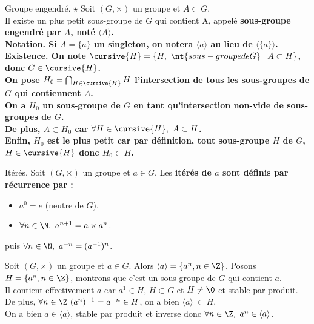 \documentclass[11pt]{article}
\begin{document}
\begin{defi}{Groupe engendré. $\star$}{}
    Soit $(G,\times)$ un groupe et $A\subset G$.\\
    Il existe un plus petit sous-groupe de $G$ qui contient A, appelé \bf{sous-groupe engendré} par $A$, noté $\langle A\rangle $.\\
    \bf{Notation.} Si $A=\{a\}$ un singleton, on notera $\langle a\rangle $ au lieu de $\langle \{a\}\rangle $.
    \tcblower
    \bf{Existence.} On note $\cursive{H}=\{H, ~ \nt{sous-groupe de G} \mid A\subset H\}$, donc $G\in \cursive{H}$.\\
    On pose $H_0=\bigcap_{H\in\cursive{H}}H$ l'intersection de tous les sous-groupes de $G$ qui contiennent $A$.\\
    On a $H_0$ un sous-groupe de $G$ en tant qu'intersection non-vide de sous-groupes de $G$.\\
    De plus, $A\subset H_0$ car $\forall H \in \cursive{H}, ~ A\subset H$.\\
    Enfin, $H_0$ est le plus petit car par définition, tout sous-groupe $H$ de $G$, $H\in\cursive{H}$ donc $H_0\subset H$.
\end{defi}

\begin{defi}{Itérés.}{}
    Soit $(G,\times)$ un groupe et $a\in G$. Les \bf{itérés} de $a$ sont définis par récurrence par :
    \begin{itemize}
        \item $a^0=e$ (neutre de $G$).
        \item $\forall n \in \N, ~ a^{n+1}=a\times a^n$.
    \end{itemize}
    puis $\forall n \in \N, ~ a^{-n}=(a^{-1})^{n}$.
\end{defi}

\vspace*{-0.8cm}

\begin{thm}{}{}
    Soit $(G,\times)$ un groupe et $a\in G$. Alors $\langle a\rangle =\{a^n,n\in\Z\}$.
    \tcblower
    \boxed{\subset} Posons $H=\{a^n, n\in \Z\}$, montrons que c'est un sous-groupe de $G$ qui contient $a$.\\
    Il contient effectivement $a$ car $a^1\in H$, $H\subset G$ et $H\neq\0$ et stable par produit.\\
    De plus, $\forall n \in \Z ~ (a^n)^{-1}=a^{-n}\in H$, on a bien $\langle a\rangle ~\subset H$.\\
    \boxed{\supset} On a bien $a\in\langle a\rangle $, stable par produit et inverse donc $\forall n \in \Z, ~ a^n \in\langle a\rangle $.
\end{thm}
\end{document}
